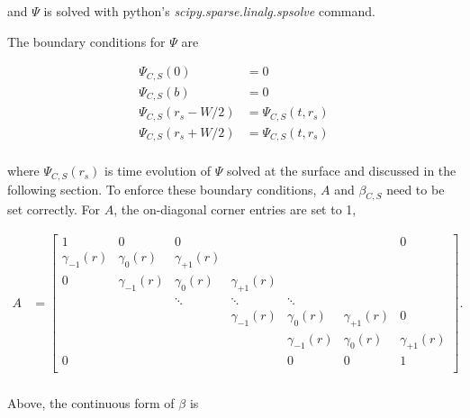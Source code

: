 \documentclass{article}
\begin{document}
\noindent and $\Psi$ is solved with python's \emph{scipy.sparse.linalg.spsolve} command.  

The boundary conditions for $\Psi$ are

\begin{equation} \label{eq:BVPAMatrix}
\begin{split}
\Psi_{C,S}(0)&=0 \\
\Psi_{C,S}(b)&=0 \\
\Psi_{C,S}(r_s-W/2)&=\Psi_{C,S}(t,r_s) \\
\Psi_{C,S}(r_s+W/2)&=\Psi_{C,S}(t,r_s) \\
\end{split}
\end{equation}

\noindent where $\Psi_{C,S}(r_s)$ is time evolution of $\Psi$ solved at the surface and discussed in the following section.  To enforce these boundary conditions, $A$ and $\beta_{C,S}$ need to be set correctly.  For $A$, the on-diagonal corner entries are set to 1, 

\begin{equation} \label{eq:BVPAMatrix}
\begin{split}
A &= 
\begin{bmatrix}
1& 0 & 0 & & & & 0\\
 \gamma_{-1}(r)  & \gamma_{0}(r)      & \gamma_{+1}(r) &  &   &  \\
0 & \gamma_{-1}(r)       & \gamma_{0}(r)      & \gamma_{+1}(r)  &  &  \\
& & \ddots      & \ddots  & \ddots  & \\
& &    &\gamma_{-1}(r)       & \gamma_{0}(r)      & \gamma_{+1}(r) & 0 \\
&        &  &  & \gamma_{-1}(r)       & \gamma_{0}(r) & \gamma_{+1}(r) \\
0 &        &  &  & 0 &  0  & 1 \\
\end{bmatrix}. \\
\end{split}
\end{equation}

Above, the continuous form of $\beta$ is
\end{document}
